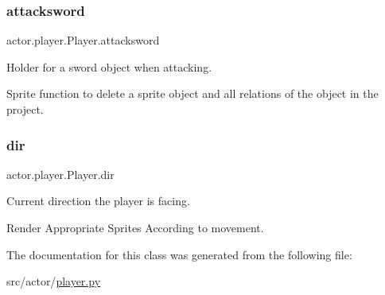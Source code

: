 \subsubsection{\texorpdfstring{attacksword}{attacksword}}
{\footnotesize\ttfamily actor.\+player.\+Player.\+attacksword}



Holder for a sword object when attacking. 

Sprite function to delete a sprite object and all relations of the object in the project. \mbox{\label{classactor_1_1player_1_1_player_a569ec214c309ddbf82e414c310861832}} 
\subsubsection{\texorpdfstring{dir}{dir}}
{\footnotesize\ttfamily actor.\+player.\+Player.\+dir}



Current direction the player is facing. 

Render Appropriate Sprites According to movement. 

The documentation for this class was generated from the following file\+:\begin{DoxyCompactItemize}
\item 
src/actor/\hyperlink{player_8py}{player.\+py}\end{DoxyCompactItemize}
